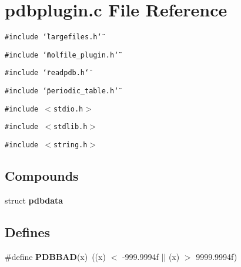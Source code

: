 \section{pdbplugin.c File Reference}
\label{pdbplugin_8c}
{\tt \#include \char`\"{}largefiles.h\char`\"{}}\par
{\tt \#include \char`\"{}molfile\_\-plugin.h\char`\"{}}\par
{\tt \#include \char`\"{}readpdb.h\char`\"{}}\par
{\tt \#include \char`\"{}periodic\_\-table.h\char`\"{}}\par
{\tt \#include $<$stdio.h$>$}\par
{\tt \#include $<$stdlib.h$>$}\par
{\tt \#include $<$string.h$>$}\par
\subsection*{Compounds}
\begin{CompactItemize}
\item 
struct {\bf pdbdata}
\end{CompactItemize}
\subsection*{Defines}
\begin{CompactItemize}
\item 
\#define {\bf PDBBAD}(x)\ ((x) $<$ -999.9994f $|$$|$ (x) $>$ 9999.9994f)
\end{CompactItemize}

